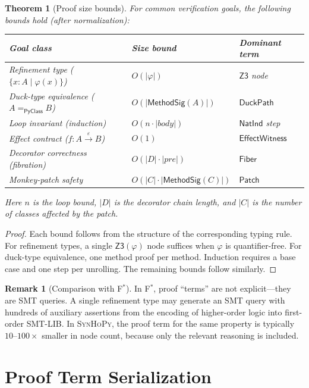 \documentclass[11pt,a4paper]{report}
\theoremstyle{definition}
\newtheorem{remark}[definition]{Remark}
\theoremstyle{plain}
\newtheorem{theorem}[definition]{Theorem}
\newcommand{\PyClass}{\mathsf{PyClass}}
\newcommand{\MethodSig}{\mathsf{MethodSig}}
\newcommand{\fstar}{F$^{*}$}
\newcommand{\synhopy}{\textsc{SynHoPy}}
\begin{document}
\begin{theorem}[Proof size bounds]
\label{thm:proof-size}
For common verification goals, the following bounds hold (after
normalization):
\begin{center}
\begin{tabular}{lll}
  \toprule
  \textbf{Goal class} & \textbf{Size bound} & \textbf{Dominant term} \\
  \midrule
  Refinement type ($\{x : A \mid \varphi(x)\}$) & $O(|\varphi|)$
    & $\mathsf{Z3}$ node \\
  Duck-type equivalence ($A =_{\PyClass} B$) & $O(|\MethodSig(A)|)$
    & $\mathsf{DuckPath}$ \\
  Loop invariant (induction) & $O(n \cdot |\mathit{body}|)$
    & $\mathsf{NatInd}$ step \\
  Effect contract ($f : A \xrightarrow{\varepsilon} B$) & $O(1)$
    & $\mathsf{EffectWitness}$ \\
  Decorator correctness (fibration) & $O(|D| \cdot |\mathit{pre}|)$
    & $\mathsf{Fiber}$ \\
  Monkey-patch safety & $O(|C| \cdot |\MethodSig(C)|)$
    & $\mathsf{Patch}$ \\
  \bottomrule
\end{tabular}
\end{center}
Here $n$ is the loop bound, $|D|$ is the decorator chain length, and $|C|$
is the number of classes affected by the patch.
\end{theorem}
\begin{proof}
Each bound follows from the structure of the corresponding typing rule.
For refinement types, a single $\mathsf{Z3}(\varphi)$ node suffices when
$\varphi$ is quantifier-free. For duck-type equivalence, one method proof
per method. Induction requires a base case and one step per unrolling.
The remaining bounds follow similarly.
\end{proof}

\begin{remark}[Comparison with \fstar{}]
In \fstar{}, proof ``terms'' are not explicit---they are SMT queries.
A single refinement type may generate an SMT query with hundreds of
auxiliary assertions from the encoding of higher-order logic into
first-order SMT-LIB. In \synhopy{}, the proof term for the same
property is typically $10$--$100\times$ smaller in node count, because
only the relevant reasoning is included.
\end{remark}


\section{Proof Term Serialization}
\label{sec:serialization}
\end{document}
